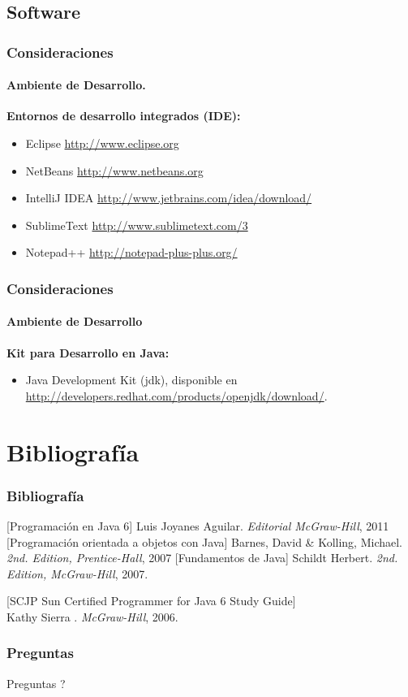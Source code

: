 \documentclass{beamer}
\begin{document}
		\subsection{Software}

		\begin{frame}
			\frametitle{Consideraciones}
			\framesubtitle{Ambiente de Desarrollo.}

			\textbf{Entornos de desarrollo integrados (IDE):}

			\begin{itemize}
				\item Eclipse  \url{http://www.eclipse.org}
				\item NetBeans \url{http://www.netbeans.org}
				\item IntelliJ IDEA  \url{http://www.jetbrains.com/idea/download/}
				\item SublimeText   \url{http://www.sublimetext.com/3}
				\item Notepad++  \url{http://notepad-plus-plus.org/}
			\end{itemize}

		\end{frame}

		\begin{frame}
			\frametitle{Consideraciones}
			\framesubtitle{Ambiente de Desarrollo}

			\textbf{Kit para Desarrollo en Java:}

			\begin{itemize}
				\item Java Development Kit (jdk), disponible en \url{http://developers.redhat.com/products/openjdk/download/}.
			\end{itemize}
		\end{frame}

	\section{Bibliograf\'ia}

		\begin{frame}
			\frametitle{Bibliograf\'ia}

			\begin{thebibliography}{10}
				\beamertemplatebookbibitems
				[Programaci\'on en Java 6] Luis Joyanes Aguilar. \newblock \emph{Editorial McGraw-Hill}, 2011
				[Programaci\'on orientada a objetos con Java] Barnes, David \& Kolling, Michael. \newblock \emph{2nd. Edition, Prentice-Hall}, 2007
				[Fundamentos de Java] Schildt Herbert. \newblock \emph{2nd. Edition, McGraw-Hill}, 2007.

[SCJP Sun Certified Programmer for Java 6 Study Guide]\\ Kathy Sierra . \newblock \emph{ McGraw-Hill}, 2006.
			\end{thebibliography}
		\end{frame}

		\begin{frame}
			\frametitle{Preguntas}

			\hspace{4cm}\huge{Preguntas ?}

		\end{frame}
	
\end{document}

